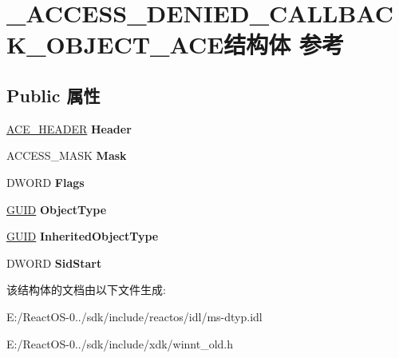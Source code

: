 \hypertarget{struct___a_c_c_e_s_s___d_e_n_i_e_d___c_a_l_l_b_a_c_k___o_b_j_e_c_t___a_c_e}{}\section{\+\_\+\+A\+C\+C\+E\+S\+S\+\_\+\+D\+E\+N\+I\+E\+D\+\_\+\+C\+A\+L\+L\+B\+A\+C\+K\+\_\+\+O\+B\+J\+E\+C\+T\+\_\+\+A\+C\+E结构体 参考}
\label{struct___a_c_c_e_s_s___d_e_n_i_e_d___c_a_l_l_b_a_c_k___o_b_j_e_c_t___a_c_e}
\subsection*{Public 属性}
\begin{DoxyCompactItemize}
\item 
\mbox{\label{struct___a_c_c_e_s_s___d_e_n_i_e_d___c_a_l_l_b_a_c_k___o_b_j_e_c_t___a_c_e_a2776e193bf1a59f6d9589a1f06bb5597}} 
\hyperlink{struct___a_c_e___h_e_a_d_e_r}{A\+C\+E\+\_\+\+H\+E\+A\+D\+ER} {\bfseries Header}
\item 
\mbox{\label{struct___a_c_c_e_s_s___d_e_n_i_e_d___c_a_l_l_b_a_c_k___o_b_j_e_c_t___a_c_e_ae0873521e150f8fe3e95905fb583db8f}} 
A\+C\+C\+E\+S\+S\+\_\+\+M\+A\+SK {\bfseries Mask}
\item 
\mbox{\label{struct___a_c_c_e_s_s___d_e_n_i_e_d___c_a_l_l_b_a_c_k___o_b_j_e_c_t___a_c_e_a525d03246076b035135fd4966d2aab47}} 
D\+W\+O\+RD {\bfseries Flags}
\item 
\mbox{\label{struct___a_c_c_e_s_s___d_e_n_i_e_d___c_a_l_l_b_a_c_k___o_b_j_e_c_t___a_c_e_aee680d794b0cfb2aaf974c8394a9318f}} 
\hyperlink{interface_g_u_i_d}{G\+U\+ID} {\bfseries Object\+Type}
\item 
\mbox{\label{struct___a_c_c_e_s_s___d_e_n_i_e_d___c_a_l_l_b_a_c_k___o_b_j_e_c_t___a_c_e_a3243f6582e7e157f39abd6436f137b7c}} 
\hyperlink{interface_g_u_i_d}{G\+U\+ID} {\bfseries Inherited\+Object\+Type}
\item 
\mbox{\label{struct___a_c_c_e_s_s___d_e_n_i_e_d___c_a_l_l_b_a_c_k___o_b_j_e_c_t___a_c_e_a653d7467d61729b5a16e9e7c041f282c}} 
D\+W\+O\+RD {\bfseries Sid\+Start}
\end{DoxyCompactItemize}


该结构体的文档由以下文件生成\+:\begin{DoxyCompactItemize}
\item 
E\+:/\+React\+O\+S-\/0../sdk/include/reactos/idl/ms-\/dtyp.\+idl\item 
E\+:/\+React\+O\+S-\/0../sdk/include/xdk/winnt\+\_\+old.\+h\end{DoxyCompactItemize}
